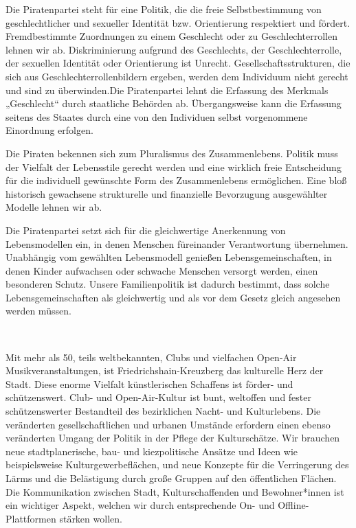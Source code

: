 \documentclass[a4paper,10pt]{article}
\newcommand{\mysection}[1]{{\vspace{1cm}\noindent\color{gray}{\ttfamily\LARGE\raggedright #1}\\\medskip}}
\begin{document}
Die Piratenpartei steht für eine Politik, die die freie Selbstbestimmung
von geschlechtlicher und sexueller Identität bzw. Orientierung
respektiert und fördert. Fremdbestimmte Zuordnungen zu einem Geschlecht
oder zu Geschlechterrollen lehnen wir ab. Diskriminierung aufgrund des
Geschlechts, der Geschlechterrolle, der sexuellen Identität oder
Orientierung ist Unrecht. Gesellschaftsstrukturen, die sich aus
Geschlechterrollenbildern ergeben, werden dem Individuum nicht gerecht
und sind zu überwinden.Die Piratenpartei lehnt die Erfassung des
Merkmals „Geschlecht`` durch staatliche Behörden ab. Übergangsweise kann
die Erfassung seitens des Staates durch eine von den Individuen selbst
vorgenommene Einordnung erfolgen.

Die Piraten bekennen sich zum Pluralismus des Zusammenlebens. Politik
muss der Vielfalt der Lebensstile gerecht werden und eine wirklich freie
Entscheidung für die individuell gewünschte Form des Zusammenlebens
ermöglichen. Eine bloß historisch gewachsene strukturelle und
finanzielle Bevorzugung ausgewählter Modelle lehnen wir ab.

Die Piratenpartei setzt sich für die gleichwertige Anerkennung von
Lebensmodellen ein, in denen Menschen füreinander Verantwortung
übernehmen. Unabhängig vom gewählten Lebensmodell genießen
Lebensgemeinschaften, in denen Kinder aufwachsen oder schwache Menschen
versorgt werden, einen besonderen Schutz. Unsere Familienpolitik ist
dadurch bestimmt, dass solche Lebensgemeinschaften als gleichwertig und
als vor dem Gesetz gleich angesehen werden müssen.


\mysection{Kultur}

Mit mehr als 50, teils weltbekannten, Clubs und vielfachen Open-Air
Musikveranstaltungen, ist Friedrichshain-Kreuzberg das kulturelle Herz
der Stadt. Diese enorme Vielfalt künstlerischen Schaffens ist förder-
und schützenswert. Club- und Open-Air-Kultur ist bunt, weltoffen und
fester schützenswerter Bestandteil des bezirklichen Nacht- und
Kulturlebens. Die veränderten gesellschaftlichen und urbanen Umstände
erfordern einen ebenso veränderten Umgang der Politik in der Pflege der
Kulturschätze. Wir brauchen neue stadtplanerische, bau- und
kiezpolitische Ansätze und Ideen wie beispielsweise
Kulturgewerbeflächen, und neue Konzepte für die Verringerung des Lärms
und die Belästigung durch große Gruppen auf den öffentlichen Flächen.
Die Kommunikation zwischen Stadt, Kulturschaffenden und Bewohner*innen
ist ein wichtiger Aspekt, welchen wir durch entsprechende On- und
Offline-Plattformen stärken wollen.
\end{document}
